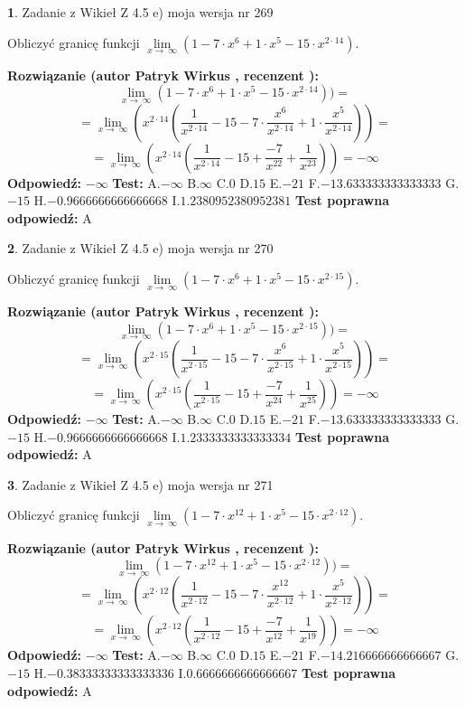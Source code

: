 \documentclass[12pt, a4paper]{article}
\theoremstyle{definition} %
\newtheorem{zad}{}
\newcommand{\zadStart}[1]{\begin{zad}#1\newline}
\newcommand{\zadStop}{\end{zad}}
\newcommand{\rozwStart}[2]{\noindent \textbf{Rozwiązanie (autor #1 , recenzent #2): }\newline}
\newcommand{\rozwStop}{\newline}
\newcommand{\odpStart}{\noindent \textbf{Odpowiedź:}\newline}
\newcommand{\odpStop}{\newline}
\newcommand{\testStart}{\noindent \textbf{Test:}\newline}
\newcommand{\testStop}{\newline}
\newcommand{\kluczStart}{\noindent \textbf{Test poprawna odpowiedź:}\newline}
\newcommand{\kluczStop}{\newline}
\begin{document}
\zadStart{Zadanie z Wikieł Z 4.5 e) moja wersja nr 269}


Obliczyć granicę funkcji  $\lim\limits_{x\to\ \infty}(1 - 7 \cdot x^{6}+1 \cdot x^{5}- 15 \cdot x^{2\cdot14})$.
\zadStop
\rozwStart{Patryk Wirkus}{}
$$\lim\limits_{x\to\ \infty}(1 - 7 \cdot x^{6}+1 \cdot x^{5}- 15 \cdot x^{2\cdot14}))=$$
$$=\lim\limits_{x\to\ \infty}(x^{2\cdot14}(\frac{1}{x^{2\cdot14}}-15 -7 \cdot \frac{x^{6}}{x^{2\cdot14}}+1 \cdot \frac{x^{5}}{x^{2\cdot14}}))=$$
$$=\lim\limits_{x\to\ \infty}(x^{2\cdot14}(\frac{1}{x^{2\cdot14}}-15 + \frac{-7}{x^{22}}+ \frac{1}{x^{23}}))=-\infty$$
\rozwStop
\odpStart
$-\infty$
\odpStop
\testStart
A.$-\infty$ B.$\infty$ C.$0$ D.$15$ E.$-21$
F.$-13.633333333333333$ G.$-15$
H.$-0.9666666666666668$
I.$1.2380952380952381$
\testStop
\kluczStart
A
\kluczStop



\zadStart{Zadanie z Wikieł Z 4.5 e) moja wersja nr 270}


Obliczyć granicę funkcji  $\lim\limits_{x\to\ \infty}(1 - 7 \cdot x^{6}+1 \cdot x^{5}- 15 \cdot x^{2\cdot15})$.
\zadStop
\rozwStart{Patryk Wirkus}{}
$$\lim\limits_{x\to\ \infty}(1 - 7 \cdot x^{6}+1 \cdot x^{5}- 15 \cdot x^{2\cdot15}))=$$
$$=\lim\limits_{x\to\ \infty}(x^{2\cdot15}(\frac{1}{x^{2\cdot15}}-15 -7 \cdot \frac{x^{6}}{x^{2\cdot15}}+1 \cdot \frac{x^{5}}{x^{2\cdot15}}))=$$
$$=\lim\limits_{x\to\ \infty}(x^{2\cdot15}(\frac{1}{x^{2\cdot15}}-15 + \frac{-7}{x^{24}}+ \frac{1}{x^{25}}))=-\infty$$
\rozwStop
\odpStart
$-\infty$
\odpStop
\testStart
A.$-\infty$ B.$\infty$ C.$0$ D.$15$ E.$-21$
F.$-13.633333333333333$ G.$-15$
H.$-0.9666666666666668$
I.$1.2333333333333334$
\testStop
\kluczStart
A
\kluczStop



\zadStart{Zadanie z Wikieł Z 4.5 e) moja wersja nr 271}


Obliczyć granicę funkcji  $\lim\limits_{x\to\ \infty}(1 - 7 \cdot x^{12}+1 \cdot x^{5}- 15 \cdot x^{2\cdot12})$.
\zadStop
\rozwStart{Patryk Wirkus}{}
$$\lim\limits_{x\to\ \infty}(1 - 7 \cdot x^{12}+1 \cdot x^{5}- 15 \cdot x^{2\cdot12}))=$$
$$=\lim\limits_{x\to\ \infty}(x^{2\cdot12}(\frac{1}{x^{2\cdot12}}-15 -7 \cdot \frac{x^{12}}{x^{2\cdot12}}+1 \cdot \frac{x^{5}}{x^{2\cdot12}}))=$$
$$=\lim\limits_{x\to\ \infty}(x^{2\cdot12}(\frac{1}{x^{2\cdot12}}-15 + \frac{-7}{x^{12}}+ \frac{1}{x^{19}}))=-\infty$$
\rozwStop
\odpStart
$-\infty$
\odpStop
\testStart
A.$-\infty$ B.$\infty$ C.$0$ D.$15$ E.$-21$
F.$-14.216666666666667$ G.$-15$
H.$-0.38333333333333336$
I.$0.6666666666666667$
\testStop
\kluczStart
A
\kluczStop
\end{document}
